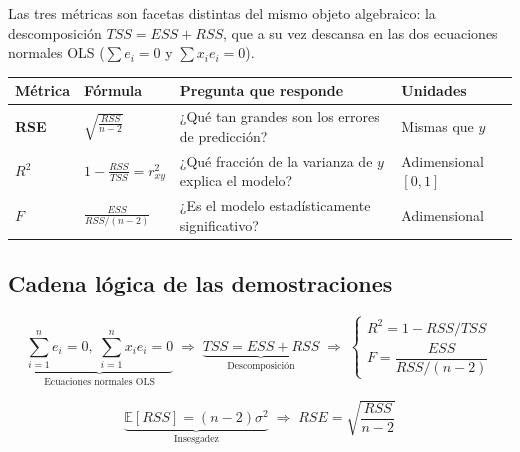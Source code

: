 \documentclass[12pt, a4paper]{article}
\newcommand{\E}[1]{\mathbb{E}\!\left[#1\right]}
\newcommand{\sumni}{\sum_{i=1}^{n}}
\begin{document}
Las tres métricas son facetas distintas del mismo objeto algebraico:
la descomposición $TSS = ESS + RSS$, que a su vez descansa en las dos
ecuaciones normales OLS ($\sum e_i = 0$ y $\sum x_i e_i = 0$).

\bigskip

\begin{center}
\renewcommand{\arraystretch}{1.8}
\begin{tabular}{>{\bfseries}l p{3.8cm} p{4.5cm} p{3cm}}
\toprule
Métrica & Fórmula & Pregunta que responde & Unidades \\
\midrule
RSE
  & $\displaystyle\sqrt{\frac{RSS}{n-2}}$
  & ¿Qué tan grandes son los errores de predicción?
  & Mismas que $y$ \\

$R^2$
  & $\displaystyle 1 - \frac{RSS}{TSS} = r_{xy}^2$
  & ¿Qué fracción de la varianza de $y$ explica el modelo?
  & Adimensional $[0,1]$ \\

$F$
  & $\displaystyle\frac{ESS}{RSS/(n-2)}$
  & ¿Es el modelo estadísticamente significativo?
  & Adimensional \\
\bottomrule
\end{tabular}
\end{center}

\bigskip

\subsection*{Cadena lógica de las demostraciones}

\[
  \underbrace{\sumni e_i = 0,\;\sumni x_i e_i = 0}_{\text{Ecuaciones normales OLS}}
  \;\Longrightarrow\;
  \underbrace{TSS = ESS + RSS}_{\text{Descomposición}}
  \;\Longrightarrow\;
  \begin{cases}
    R^2 = 1 - RSS/TSS \\[4pt]
    F = \dfrac{ESS}{RSS/(n-2)}
  \end{cases}
\]

\[
  \underbrace{\E{RSS} = (n-2)\sigma^2}_{\text{Insesgadez}}
  \;\Longrightarrow\;
  RSE = \sqrt{\dfrac{RSS}{n-2}}
\]


\end{document}
